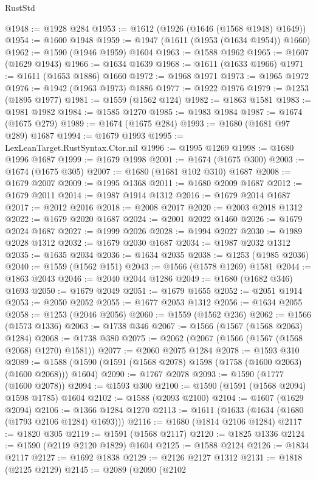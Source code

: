 \begin{lexlean}{RustStd}
\begin{coremodule}
@1948 := @1928 @284
@1953 := @1612 (@1926 (@1646 (@1568 @1948) @1649))
@1954 := @1600 @1948
@1959 := @1947 (@1611 (@1953 (@1634 @1954)) @1660)
@1962 := @1590 (@1946 @1959) @1604
@1963 := @1588 @1962
@1965 := @1607 (@1629 @1943)
@1966 := @1634 @1639
@1968 := @1611 (@1633 @1966)
@1971 := @1611 (@1653 @1886) @1660
@1972 := @1968 @1971
@1973 := @1965 @1972
@1976 := @1942 (@1963 @1973) @1886
@1977 := @1922 @1976
@1979 := @1253 (@1895 @1977)
@1981 := @1559 (@1562 @124)
@1982 := @1863 @1581
@1983 := @1981 @1982
@1984 := @1585 @1270
@1985 := @1983 @1984
@1987 := @1674 (@1675 @279)
@1989 := @1674 (@1675 @284)
@1993 := @1680 (@1681 @97 @289) @1687
@1994 := @1679 @1993
@1995 := LexLeanTarget.RustSyntax.Ctor.nil
@1996 := @1995 @1269
@1998 := @1680 @1996 @1687
@1999 := @1679 @1998
@2001 := @1674 (@1675 @300)
@2003 := @1674 (@1675 @305)
@2007 := @1680 (@1681 @102 @310) @1687
@2008 := @1679 @2007
@2009 := @1995 @1368
@2011 := @1680 @2009 @1687
@2012 := @1679 @2011
@2014 := @1987 @1914 @1312
@2016 := @1679 @2014 @1687
@2017 := @2012 @2016
@2018 := @2008 @2017
@2020 := @2003 @2018 @1312
@2022 := @1679 @2020 @1687
@2024 := @2001 @2022 @1460
@2026 := @1679 @2024 @1687
@2027 := @1999 @2026
@2028 := @1994 @2027
@2030 := @1989 @2028 @1312
@2032 := @1679 @2030 @1687
@2034 := @1987 @2032 @1312
@2035 := @1635 @2034
@2036 := @1634 @2035
@2038 := @1253 (@1985 @2036)
@2040 := @1559 (@1562 @151)
@2043 := @1566 (@1578 @1269) @1581
@2044 := @1863 @2043
@2046 := @2040 @2044 @1286
@2049 := @1680 (@1682 @346) @1693
@2050 := @1679 @2049
@2051 := @1679 @1655
@2052 := @2051 @1914
@2053 := @2050 @2052
@2055 := @1677 @2053 @1312
@2056 := @1634 @2055
@2058 := @1253 (@2046 @2056)
@2060 := @1559 (@1562 @236)
@2062 := @1566 (@1573 @1336)
@2063 := @1738 @346
@2067 := @1566 (@1567 (@1568 @2063) @1284)
@2068 := @1738 @380
@2075 := @2062 (@2067 (@1566 (@1567 (@1568 @2068) @1270) @1581))
@2077 := @2060 @2075 @1284
@2078 := @1593 @310
@2089 := @1588 (@1590 (@1591 (@1568 @2078) @1598 (@1758 (@1600 @2063) (@1600 @2068))) @1604)
@2090 := @1767 @2078
@2093 := @1590 (@1777 (@1600 @2078))
@2094 := @1593 @300
@2100 := @1590 (@1591 (@1568 @2094) @1598 @1785) @1604
@2102 := @1588 (@2093 @2100)
@2104 := @1607 (@1629 @2094)
@2106 := @1366 @1284 @1270
@2113 := @1611 (@1633 (@1634 (@1680 (@1793 @2106 @1284) @1693)))
@2116 := @1680 (@1814 @2106 @1284)
@2117 := @1820 @305
@2119 := @1591 (@1568 @2117)
@2120 := @1825 @1336
@2124 := @1590 (@2119 @2120 @1829) @1604
@2125 := @1588 @2124
@2126 := @1834 @2117
@2127 := @1692 @1838
@2129 := @2126 @2127 @1312
@2131 := @1818 (@2125 @2129)
@2145 := @2089
    (@2090
      (@2102

\end{coremodule}
\end{lexlean}
